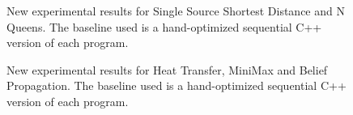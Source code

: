 \documentclass[10pt]{article}
\begin{document}
\begin{figure}[h]
\begin{center}
\end{center}
\caption{New experimental results for Single Source Shortest Distance and N
   Queens. The baseline used is a hand-optimized sequential C++ version of each
   program.}
\label{fig:res2}
\end{figure}

\begin{figure}[h]
\begin{center}
\end{center}
\begin{center}
\end{center}
\caption{New experimental results for Heat Transfer, MiniMax and Belief
   Propagation. The baseline used is a hand-optimized sequential C++ version of
   each program.}
\label{fig:res3}
\end{figure}
\end{document}
